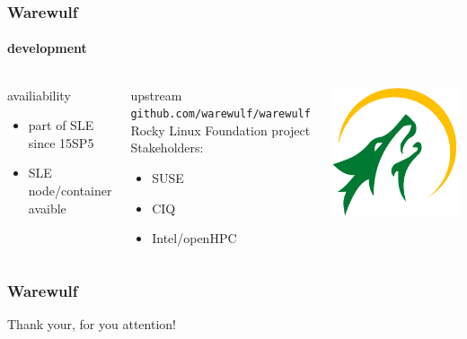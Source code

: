 \documentclass[aspectratio=169]{beamer}
\begin{document}
\begin{frame}[fragile]
\frametitle{Warewulf}
\framesubtitle{development}
\begin{columns}
\begin{block}{availiability}
  \begin{itemize}
    \item part of SLE since 15SP5
    \item SLE node/container avaible
  \end{itemize}
\end{block}
\begin{block}{upstream}
\texttt{github.com/warewulf/warewulf} \\
Rocky Linux Foundation project\\
Stakeholders:
\begin{itemize}
  \item SUSE
  \item CIQ
  \item Intel/openHPC
\end{itemize}
\end{block}
\includegraphics[width=.8\linewidth]{warewulf-logo}
\end{columns}
\end{frame}
\begin{frame}[fragile]
\frametitle{Warewulf}
Thank your, for you attention!
\end{frame}
\end{document}
